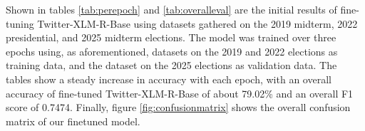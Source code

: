 \clearpage

Shown in tables \ref{tab:perepoch} and \ref{tab:overalleval} are the initial results of fine-tuning Twitter-XLM-R-Base using datasets gathered on the 2019 midterm, 2022 presidential, and 2025 midterm elections. The model was trained over three epochs using, as aforementioned, datasets on the 2019 and 2022 elections as training data, and the dataset on the 2025 elections as validation data. The tables show a steady increase in accuracy with each epoch, with an overall accuracy of fine-tuned Twitter-XLM-R-Base of about 79.02\% and an overall F1 score of 0.7474. Finally, figure \ref{fig:confusionmatrix} shows the overall confusion matrix of our finetuned model.




